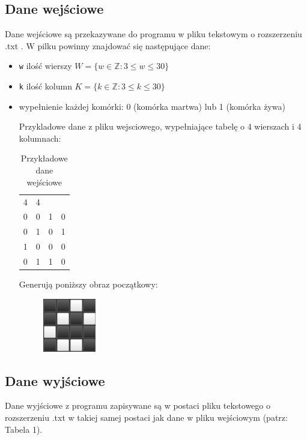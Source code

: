 \documentclass[a4paper]{article}
\begin{document}
\subsection{Dane wej\'sciowe}
\quad Dane wej\'sciowe s\k{a} przekazywane do programu w pliku tekstowym o rozszerzeniu .txt . W pilku powinny znajdowa\'c si\k{e} nast\k{e}puj\k{a}ce dane: 
\begin{itemize}
	\item \texttt{w} ilo\'s\'c wierszy $W = \{ w \in \mathbb{Z} : 3 \leq w \leq 30 \} $
	\item \texttt{k} ilo\'s\'c kolumn $K = \{ k \in \mathbb{Z} : 3 \leq k \leq 30 \} $
	\item wype\l{}nienie ka\.zdej kom\'orki: 0 (kom\'orka martwa) lub 1 (kom\'orka \.zywa)
		
		Przykladowe dane z pliku wejsciowego, wype\l{}niaj\k{a}ce tabel\k{e} o 4 wierszach i 4 kolumnach:
		\begin{table}[h!]
		\begin{center}
			\begin{tabular}{c c c c}
				4 & 4         \\
				0 & 0 & 1 & 0 \\
				0 & 1 & 0 & 1 \\
				1 & 0 & 0 & 0 \\
				0 & 1 & 1 & 0 \\
			\end{tabular}
			{\color{gray}\caption{Przyk\l{}adowe dane wej\'sciowe}}
			
			\label{table:tab1}
		\end{center}
		\end{table}

		Generuj\k{a} poni\.zszy obraz pocz\k{a}tkowy:

		\begin{figure}[h]
			\centering
			\includegraphics{obraz}
		\end{figure}
\end{itemize}

\subsection{Dane wyj\'sciowe}
\quad Dane wyj\'sciowe z programu zapisywane s\k{a} w postaci pliku tekstowego o rozszerzeniu .txt w takiej samej postaci jak dane w pliku wej\'sciowym (patrz: Tabela 1).
\end{document}
